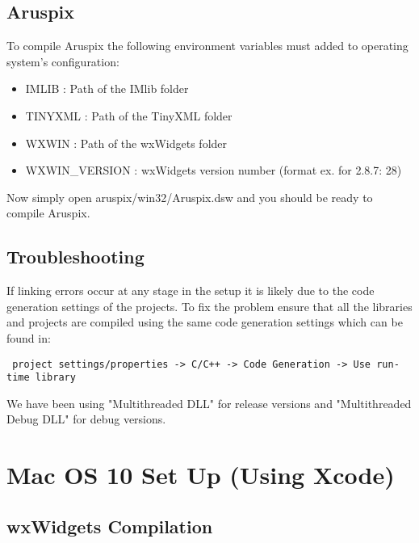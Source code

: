 \documentclass[]{article}
\begin{document}
\subsection{Aruspix}

To compile Aruspix the following environment variables must added to operating
system's configuration:
\begin{itemize}
	\item IMLIB : Path of the IMlib folder
	\item TINYXML : Path of the TinyXML folder
	\item WXWIN : Path of the wxWidgets folder
	\item WXWIN\_VERSION : wxWidgets version number (format ex. for 2.8.7: 28)
\end{itemize}
Now simply open aruspix/win32/Aruspix.dsw and you should be ready to compile Aruspix.

\subsection{Troubleshooting}

If linking errors occur at any stage in the setup it is likely due to the code
generation settings of the projects. To fix the problem ensure that all the
libraries and projects are compiled using the same code generation settings
which can be found in: 
\begin{verbatim} project settings/properties -> C/C++ -> Code Generation -> Use run-time library \end{verbatim} 
We have been using "Multithreaded DLL" for release versions and "Multithreaded
Debug DLL" for debug versions.

\section{Mac OS 10 Set Up (Using Xcode)}

\subsection{wxWidgets Compilation}
	
\end{document}
